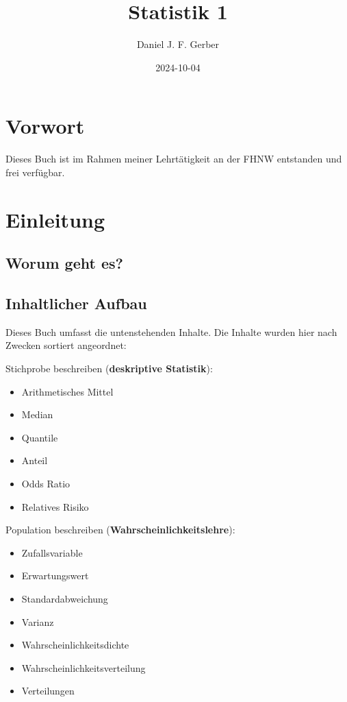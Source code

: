 \documentclass[
]{book}
\title{Statistik 1}
\author{Daniel J. F. Gerber}
\date{2024-10-04}
\providecommand{\tightlist}{%
  \setlength{\itemsep}{0pt}\setlength{\parskip}{0pt}}
\begin{document}
\maketitle

{
\setcounter{tocdepth}{1}
\tableofcontents
}
\chapter*{Vorwort}\label{vorwort}

Dieses Buch ist im Rahmen meiner Lehrtätigkeit an der FHNW entstanden und frei verfügbar.

\chapter{Einleitung}\label{einleitung}

\section{Worum geht es?}\label{worum-geht-es}

\section{Inhaltlicher Aufbau}\label{inhaltlicher-aufbau}

Dieses Buch umfasst die untenstehenden Inhalte. Die Inhalte wurden hier nach Zwecken sortiert angeordnet:

Stichprobe beschreiben (\textbf{deskriptive Statistik}):

\begin{itemize}
\tightlist
\item
  Arithmetisches Mittel
\item
  Median
\item
  Quantile
\item
  Anteil
\item
  Odds Ratio
\item
  Relatives Risiko
\end{itemize}

Population beschreiben (\textbf{Wahrscheinlichkeitslehre}):

\begin{itemize}
\tightlist
\item
  Zufallsvariable
\item
  Erwartungswert
\item
  Standardabweichung
\item
  Varianz
\item
  Wahrscheinlichkeitsdichte
\item
  Wahrscheinlichkeitsverteilung
\item
  Verteilungen
\end{itemize}
\end{document}
